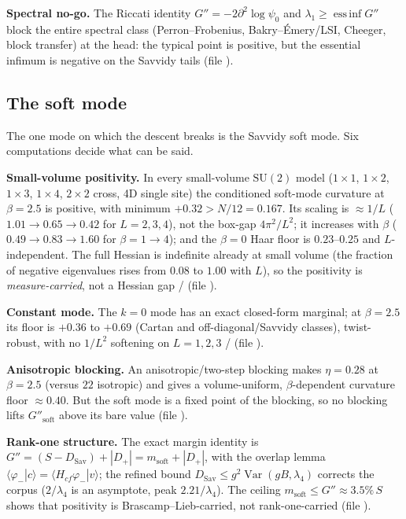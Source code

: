 \textbf{Spectral no-go.} The Riccati identity $G''=-2\partial^2\log\psi_0$ and
$\lambda_1\ge\operatorname{ess\,inf}G''$ block the entire spectral class (Perron--Frobenius,
Bakry--\'Emery/LSI, Cheeger, block transfer) at the head: the typical point is positive, but the
essential infimum is negative on the Savvidy tails \LN{} (file ).

\subsection{The soft mode}

The one mode on which the descent breaks is the Savvidy soft mode. Six computations decide what can
be said.

\textbf{Small-volume positivity.} In every small-volume $\mathrm{SU}(2)$ model ($1\times1$,
$1\times2$, $1\times3$, $1\times4$, $2\times2$ cross, 4D single site) the conditioned soft-mode
curvature at $\beta=2.5$ is positive, with minimum $+0.32>N/12=0.167$. Its scaling is
$\approx1/L$ ($1.01\to0.65\to0.42$ for $L=2,3,4$), not the box-gap $4\pi^2/L^2$; it increases with
$\beta$ ($0.49\to0.83\to1.60$ for $\beta=1\to4$); and the $\beta=0$ Haar floor is $0.23$--$0.25$
and $L$-independent. The full Hessian is indefinite already at small volume (the fraction of
negative eigenvalues rises from $0.08$ to $1.00$ with $L$), so the positivity is
\emph{measure-carried}, not a Hessian gap \LT/\LE{} (file ).

\textbf{Constant mode.} The $k=0$ mode has an exact closed-form marginal; at $\beta=2.5$ its floor is
$+0.36$ to $+0.69$ (Cartan and off-diagonal/Savvidy classes), twist-robust, with no $1/L^2$
softening on $L=1,2,3$ \LT/\LE{} (file ).

\textbf{Anisotropic blocking.} An anisotropic/two-step blocking makes $\eta=0.28$ at $\beta=2.5$
(versus $22$ isotropic) and gives a volume-uniform, $\beta$-dependent curvature floor $\approx0.40$.
But the soft mode is a fixed point of the blocking, so no blocking lifts $G''_{\mathrm{soft}}$ above
its bare value \LT{} (file ).

\textbf{Rank-one structure.} The exact margin identity is
$G''=(S-D_{\mathrm{Sav}})+|D_+|=m_{\mathrm{soft}}+|D_+|$, with the overlap lemma
$\langle\varphi_-|c\rangle=\langle H_{cf}\varphi_-|v\rangle$; the refined bound
$D_{\mathrm{Sav}}\le g^2\operatorname{Var}(gB,\lambda_4)$ corrects the corpus ($2/\lambda_4$ is an
asymptote, peak $2.21/\lambda_4$). The ceiling $m_{\mathrm{soft}}\le G''\approx3.5\%\,S$ shows that
positivity is Brascamp--Lieb-carried, not rank-one-carried \LT{} (file ).

